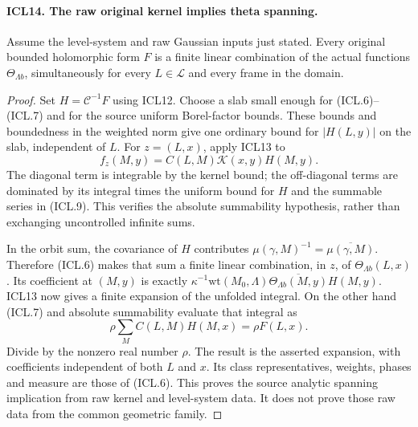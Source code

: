 \documentclass[11pt,a4paper]{article}
\numberwithin{equation}{section}
\theoremstyle{remark}\newtheorem{remark}[theorem]{Remark}
\begin{document}
\paragraph{ICL14. The raw original kernel implies theta spanning.}
\label{claim:ICL14}
Assume the level-system and raw Gaussian inputs just
stated.  Every original bounded holomorphic form \(F\)
is a finite linear combination of the actual functions
\(\Theta_{\Lambda b}\), simultaneously for every
\(L\in\mathcal L\) and every frame in the domain.
\begin{proof}
Set \(H=\mathcal C^{-1}F\) using ICL12.  Choose a slab
small enough for (ICL.6)--(ICL.7) and for the source
uniform Borel-factor bounds.  These bounds and boundedness
in the weighted norm give one ordinary bound for
\(|H(L,y)|\) on the slab, independent of \(L\).
For \(z=(L,x)\), apply ICL13 to
\[
 f_z(M,y)=C(L,M)\mathcal K(x,y)H(M,y).
\]
The diagonal term is integrable by the kernel bound;
the off-diagonal terms are dominated by its integral
times the uniform bound for \(H\) and the summable
series in (ICL.9).  This verifies the absolute
summability hypothesis, rather than exchanging
uncontrolled infinite sums.

In the orbit sum, the covariance of \(H\) contributes
\(\mu(\gamma,M)^{-1}=\overline{\mu(\gamma,M)}\).
Therefore (ICL.6) makes that sum a finite linear
combination, in \(z\), of
\(\Theta_{\Lambda b}(L,x)\).  Its coefficient at
\((M,y)\) is exactly
\(\kappa^{-1}\mathrm{wt}(M_0,\Lambda)
\overline{\Theta_{\Lambda b}(M,y)}H(M,y)\).
ICL13 now gives a finite expansion of the unfolded
integral.  On the other hand (ICL.7) and absolute
summability evaluate that integral as
\[
 \rho\sum_M C(L,M)H(M,x)=\rho F(L,x).
\]
Divide by the nonzero real number \(\rho\).  The result
is the asserted expansion, with coefficients independent
of both \(L\) and \(x\).  Its class representatives,
weights, phases and measure are those of (ICL.6).
This proves the source analytic spanning implication
from raw kernel and level-system data.  It does not
prove those raw data from the common geometric family.
\end{proof}

\end{document}
